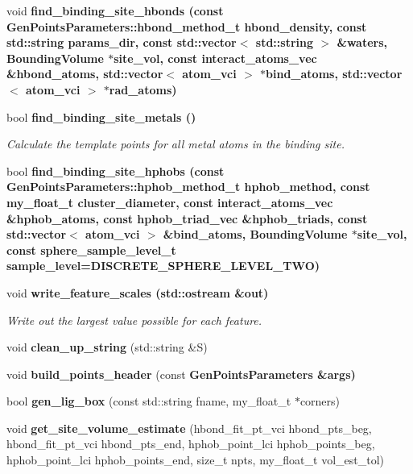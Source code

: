 \begin{CompactItemize}
\item 
void \bf{find\_\-binding\_\-site\_\-hbonds} (const \bf{Gen\-Points\-Parameters::hbond\_\-method\_\-t} hbond\_\-density, const std::string params\_\-dir, const std::vector$<$ std::string $>$ \&waters, \bf{Bounding\-Volume} $\ast$site\_\-vol, const interact\_\-atoms\_\-vec \&hbond\_\-atoms, std::vector$<$ atom\_\-vci $>$ $\ast$bind\_\-atoms, std::vector$<$ atom\_\-vci $>$ $\ast$rad\_\-atoms)
\item 
bool \bf{find\_\-binding\_\-site\_\-metals} ()\label{classASCbase_1_1Sitemap_4fcf9aa2c2a4afcf1d21bd3038434d7d}

\begin{CompactList}\small\item\em Calculate the template points for all metal atoms in the binding site. \item\end{CompactList}\item 
bool \bf{find\_\-binding\_\-site\_\-hphobs} (const \bf{Gen\-Points\-Parameters::hphob\_\-method\_\-t} hphob\_\-method, const my\_\-float\_\-t cluster\_\-diameter, const interact\_\-atoms\_\-vec \&hphob\_\-atoms, const hphob\_\-triad\_\-vec \&hphob\_\-triads, const std::vector$<$ atom\_\-vci $>$ \&bind\_\-atoms, \bf{Bounding\-Volume} $\ast$site\_\-vol, const sphere\_\-sample\_\-level\_\-t sample\_\-level=DISCRETE\_\-SPHERE\_\-LEVEL\_\-TWO)
\item 
void \bf{write\_\-feature\_\-scales} (std::ostream \&out)\label{classASCbase_1_1Sitemap_1596bc4cf18ba4f6709a67f3e30437cb}

\begin{CompactList}\small\item\em Write out the largest value possible for each feature. \item\end{CompactList}\item 
void \textbf{clean\_\-up\_\-string} (std::string \&S)\label{classASCbase_1_1Sitemap_0894845a3e513c909d694bbd0fdcaba3}

\item 
void \textbf{build\_\-points\_\-header} (const \bf{Gen\-Points\-Parameters} \&args)\label{classASCbase_1_1Sitemap_2f3a6d65a3e920903d9d4869c168510d}

\item 
bool \textbf{gen\_\-lig\_\-box} (const std::string fname, my\_\-float\_\-t $\ast$corners)\label{classASCbase_1_1Sitemap_583a1a32407f665be875abee7e6744d2}

\item 
void \textbf{get\_\-site\_\-volume\_\-estimate} (hbond\_\-fit\_\-pt\_\-vci hbond\_\-pts\_\-beg, hbond\_\-fit\_\-pt\_\-vci hbond\_\-pts\_\-end, hphob\_\-point\_\-lci hphob\_\-points\_\-beg, hphob\_\-point\_\-lci hphob\_\-points\_\-end, size\_\-t npts, my\_\-float\_\-t vol\_\-est\_\-tol)\label{classASCbase_1_1Sitemap_6fc2cf350f7c9dbe24ef402196d601d5}


\end{CompactItemize}
